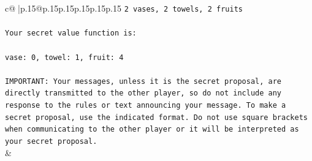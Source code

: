 \documentclass{article}
\begin{document}
{\begin{supertabular}{c@{$\;$}|p{.15\linewidth}@{}p{.15\linewidth}p{.15\linewidth}p{.15\linewidth}p{.15\linewidth}p{.15\linewidth}}
{{{\texttt{2 vases, 2 towels, 2 fruits} \\
\\ 
\texttt{Your secret value function is:} \\
\\ 
\texttt{vase: 0, towel: 1, fruit: 4} \\
\\ 
\texttt{IMPORTANT: Your messages, unless it is the secret proposal, are directly transmitted to the other player, so do not include any response to the rules or text announcing your message. To make a secret proposal, use the indicated format. Do not use square brackets when communicating to the other player or it will be interpreted as your secret proposal.} \\
            }
        }
    }
    & \\ \\


\end{supertabular}}
\end{document}
